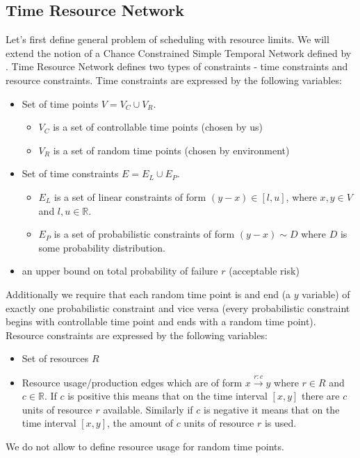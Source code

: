 \documentclass{article}
\begin{document}
\begin{multicols}{2}
\subsection{Time Resource Network}
Let's first define general problem of scheduling with resource limits. We will extend the notion of a Chance Constrained Simple Temporal Network defined by \cite{Fang2014}. Time Resource Network defines two types of constraints - time constraints and resource constraints. Time constraints are expressed by the following variables:
\begin{itemize}
\item Set of time points $V = V_C \cup V_R $.
\begin{itemize}
\item $V_C$ is a set of controllable time points (chosen by us)
\item $V_R$ is a set of random time points (chosen by environment)
\end{itemize}
\item Set of time constraints $E = E_L \cup E_P $.
\begin{itemize}
\item $E_L$ is a set of linear constraints of form $(y-x) \in [l,u]$, where $x,y \in V$ and $l,u \in \mathbb{R}$.
\item $E_P$ is a set of probabilistic constraints of form $ (y-x) \sim D$ where $D$ is some probability distribution.
\end{itemize}
\item an upper bound on total probability of failure $r$ (acceptable risk)
\end{itemize}
Additionally we require that each random time point is and end (a $y$ variable) of exactly one probabilistic constraint and vice versa (every probabilistic constraint begins with controllable time point and ends with a random time point).\\
Resource constraints are expressed by the following variables:
\begin{itemize}
\item Set of resources $R$
\item Resource usage/production edges which are of form $x \xrightarrow{r:c} y$ where $r\in R$ and $c \in \mathbb{R}$. If $c$ is positive this means that on the time interval $[x,y]$ there are $c$ units of resource $r$ available. Similarly if $c$ is negative it means that on the time interval $[x,y]$, the amount of $c$ units of resource $r$ is used.
\end{itemize}
We do not allow to define resource usage for random time points.

\end{multicols}
\end{document}
